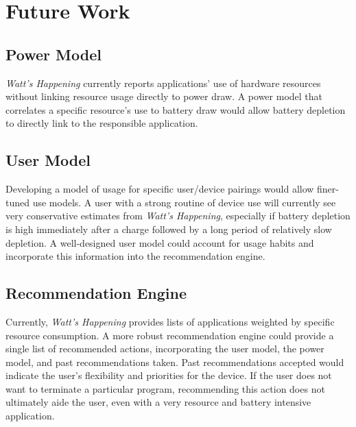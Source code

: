 \section{Future Work}
\label{sec:future}
\subsection{Power Model}
\emph{Watt's Happening} currently reports applications' use of hardware resources without linking resource usage directly to power draw.
A power model that correlates a specific resource's use to battery draw would allow battery depletion to directly link to the responsible application.

\subsection{User Model}
Developing a model of usage for specific user/device pairings would allow finer-tuned use models.
A user with a strong routine of device use will currently see very conservative estimates from \emph{Watt's Happening}, especially if battery depletion is high immediately after a charge followed by a long period of relatively slow depletion. 
A well-designed user model could account for usage habits and incorporate this information into the recommendation engine.

\subsection{Recommendation Engine}
Currently, \emph{Watt's Happening} provides lists of applications weighted by specific resource consumption.
A more robust recommendation engine could provide a single list of recommended actions, incorporating the user model, the power model, and past recommendations taken.
Past recommendations accepted would indicate the user's flexibility and priorities for the device.
If the user does not want to terminate a particular program, recommending this action does not ultimately aide the user, even with a very resource and battery intensive application.


